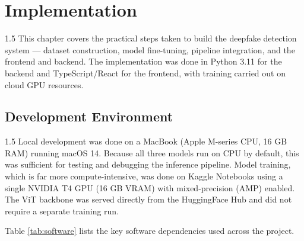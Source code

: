 \chapter{Implementation}

\begin{spacing}{1.5}
This chapter covers the practical steps taken to build the deepfake detection system --- dataset construction, model fine-tuning, pipeline integration, and the frontend and backend. The implementation was done in Python 3.11 for the backend and TypeScript/React for the frontend, with training carried out on cloud GPU resources.
\end{spacing}

\section{Development Environment}

\begin{spacing}{1.5}
Local development was done on a MacBook (Apple M-series CPU, 16 GB RAM) running macOS 14. Because all three models run on CPU by default, this was sufficient for testing and debugging the inference pipeline. Model training, which is far more compute-intensive, was done on Kaggle Notebooks using a single NVIDIA T4 GPU (16 GB VRAM) with mixed-precision (AMP) enabled. The ViT backbone was served directly from the HuggingFace Hub and did not require a separate training run.

Table \ref{tab:software} lists the key software dependencies used across the project.
\end{spacing}

